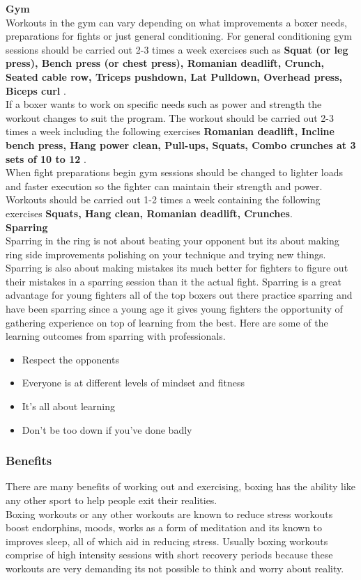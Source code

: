 \documentclass[a4paper,12pt]{report}
\begin{document}
\textbf{Gym}\\
Workouts in the gym can vary depending on what improvements a boxer needs, preparations for fights or just general conditioning.
For general conditioning gym sessions should be carried out 2-3 times a week exercises such as 
   \textbf{Squat (or leg press), Bench press (or chest press), Romanian deadlift, Crunch, Seated cable row, Triceps pushdown, Lat Pulldown, Overhead press, Biceps curl
 }.\\
If a boxer wants to work on specific needs such as power and strength the workout changes to suit the program.
The workout should be carried out 2-3 times a week including the following exercises \textbf{Romanian deadlift, Incline bench press, Hang power clean, Pull-ups, Squats, Combo crunches at 3 sets of 10 to 12
}.\\
When fight preparations begin gym sessions should be changed to lighter loads and faster execution so the fighter can maintain their strength and power.
Workouts should be carried out 1-2 times a week containing the following exercises \textbf{Squats, Hang clean, Romanian deadlift, Crunches}.\cite{gymWorkout}\\

\textbf{Sparring}\\
Sparring in the ring is not about beating your opponent but its about making ring side improvements polishing on your technique and trying new things. Sparring is also about making mistakes its much better for fighters to figure out their mistakes in a sparring session than it the actual fight.  
Sparring is a great advantage for young fighters all of the top boxers out there practice sparring and have been sparring since a young age it gives young fighters the opportunity of gathering experience on top of learning from the best. 
Here are some of the learning outcomes from sparring with professionals.\cite{sparringWorkout}
\begin{itemize}
    \item Respect the opponents
    \item Everyone is at different levels of mindset and fitness
    \item It’s all about learning
    \item Don’t be too down if you’ve done badly
\end{itemize}

\subsubsection{Benefits}
There are many benefits of working out and exercising, boxing has the ability like any other sport to help people exit their realities.\\
Boxing workouts or any other workouts are known to reduce stress workouts boost endorphins,  moods, works as a form of meditation and its known to improves sleep, all of which aid in reducing stress.
Usually boxing workouts comprise of high intensity sessions with short recovery periods because these workouts are very demanding its not possible to think and worry about reality.\\
\end{document}
